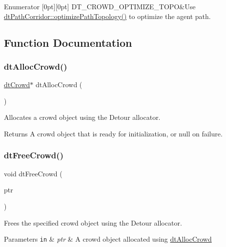 \begin{DoxyEnumFields}{Enumerator}
[0pt][0pt]{}\mbox{\label{group__crowd_ggaa94b67d2fdcc390690c523f28019e52fa89c6f7f2e49254e775cb2b85259a0a93}} 
D\+T\+\_\+\+C\+R\+O\+W\+D\+\_\+\+O\+P\+T\+I\+M\+I\+Z\+E\+\_\+\+T\+O\+PO&Use \hyperlink{classdtPathCorridor_a69288d28ab5d23b2c2654e45c5a33c25}{dt\+Path\+Corridor\+::optimize\+Path\+Topology()} to optimize the agent path. \\
\hline

\end{DoxyEnumFields}


\subsection{Function Documentation}
\mbox{\label{group__crowd_ga01a53c9d76d1b61678ab1944dfbfac55}} 
\subsubsection{\texorpdfstring{dt\+Alloc\+Crowd()}{dtAllocCrowd()}}
{\footnotesize\ttfamily \hyperlink{classdtCrowd}{dt\+Crowd}$\ast$ dt\+Alloc\+Crowd (\begin{DoxyParamCaption}{ }\end{DoxyParamCaption})}

Allocates a crowd object using the Detour allocator. \begin{DoxyReturn}{Returns}
A crowd object that is ready for initialization, or null on failure. 
\end{DoxyReturn}
\mbox{\label{group__crowd_ga9475313642645070e78c359e0fc02b7a}} 
\subsubsection{\texorpdfstring{dt\+Free\+Crowd()}{dtFreeCrowd()}}
{\footnotesize\ttfamily void dt\+Free\+Crowd (\begin{DoxyParamCaption}\item[{\hyperlink{classdtCrowd}{dt\+Crowd} $\ast$}]{ptr }\end{DoxyParamCaption})}

Frees the specified crowd object using the Detour allocator. 
\begin{DoxyParams}[1]{Parameters}
\mbox{\tt in}  & {\em ptr} & A crowd object allocated using \hyperlink{group__crowd_ga01a53c9d76d1b61678ab1944dfbfac55}{dt\+Alloc\+Crowd} \\
\hline
\end{DoxyParams}
